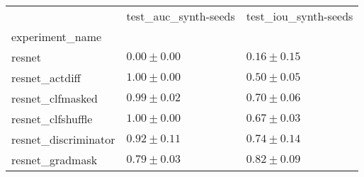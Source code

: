 \begin{tabular}{lll}
\toprule
{} & test_auc_synth-seeds & test_iou_synth-seeds \\
experiment_name      &                      &                      \\
\midrule
resnet               &        $0.00\pm0.00$ &        $0.16\pm0.15$ \\
resnet_actdiff       &        $1.00\pm0.00$ &        $0.50\pm0.05$ \\
resnet_clfmasked     &        $0.99\pm0.02$ &        $0.70\pm0.06$ \\
resnet_clfshuffle    &        $1.00\pm0.00$ &        $0.67\pm0.03$ \\
resnet_discriminator &        $0.92\pm0.11$ &        $0.74\pm0.14$ \\
resnet_gradmask      &        $0.79\pm0.03$ &        $0.82\pm0.09$ \\
\bottomrule
\end{tabular}
